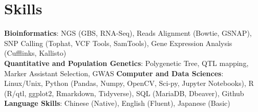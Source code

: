 \documentclass[11pt,a4paper,]{awesome-cv}
\begin{document}
\hypertarget{skills}{%
\section{Skills}\label{skills}}

\textbf{Bioinformatics}: NGS (GBS, RNA-Seq), Reads Alignment (Bowtie,
GSNAP), SNP Calling (Tophat, VCF Tools, SamTools), Gene Expression
Analysis (Cufflinks, Kallisto)\\
\textbf{Quantitative and Population Genetics}: Polygenetic Tree, QTL
mapping, Marker Assistant Selection, GWAS \textbf{Computer and Data
Sciences}: Linux/Unix, Python (Pandas, Numpy, OpenCV, Sci-py, Jupyter
Notebooks), R (R/qtl, ggplot2, Rmarkdown, Tidyverse), SQL (MariaDB,
Dbeaver), Github\\
\textbf{Language Skills}: Chinese (Native), English (Fluent), Japanese
(Basic)
\end{document}
